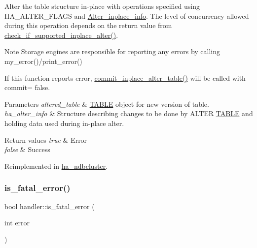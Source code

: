 Alter the table structure in-\/place with operations specified using H\+A\+\_\+\+A\+L\+T\+E\+R\+\_\+\+F\+L\+A\+GS and \mbox{\hyperlink{classAlter__inplace__info}{Alter\+\_\+inplace\+\_\+info}}. The level of concurrency allowed during this operation depends on the return value from \mbox{\hyperlink{classhandler_a67890a9deb89b9ef0128601e7687fcba}{check\+\_\+if\+\_\+supported\+\_\+inplace\+\_\+alter()}}.

\begin{DoxyNote}{Note}
Storage engines are responsible for reporting any errors by calling my\+\_\+error()/print\+\_\+error()

If this function reports error, \mbox{\hyperlink{classhandler_a0786a5f57ccd3c97bff07b1afeae9c06}{commit\+\_\+inplace\+\_\+alter\+\_\+table()}} will be called with commit= false.
\end{DoxyNote}

\begin{DoxyParams}{Parameters}
{\em altered\+\_\+table} & \mbox{\hyperlink{structTABLE}{T\+A\+B\+LE}} object for new version of table. \\
\hline
{\em ha\+\_\+alter\+\_\+info} & Structure describing changes to be done by A\+L\+T\+ER \mbox{\hyperlink{structTABLE}{T\+A\+B\+LE}} and holding data used during in-\/place alter.\\
\hline
\end{DoxyParams}

\begin{DoxyRetVals}{Return values}
{\em true} & Error \\
\hline
{\em false} & Success \\
\hline
\end{DoxyRetVals}


Reimplemented in \mbox{\hyperlink{classha__ndbcluster_a5ff1e368997d6822e3285080fade11fe}{ha\+\_\+ndbcluster}}.

\mbox{\label{classhandler_a37413b5d60b340ffe26a6713b65bab75}} 
\subsubsection{\texorpdfstring{is\+\_\+fatal\+\_\+error()}{is\_fatal\_error()}}
{\footnotesize\ttfamily bool handler\+::is\+\_\+fatal\+\_\+error (\begin{DoxyParamCaption}\item[{int}]{error }\end{DoxyParamCaption})\hspace{0.3cm}{\ttfamily [virtual]}}



